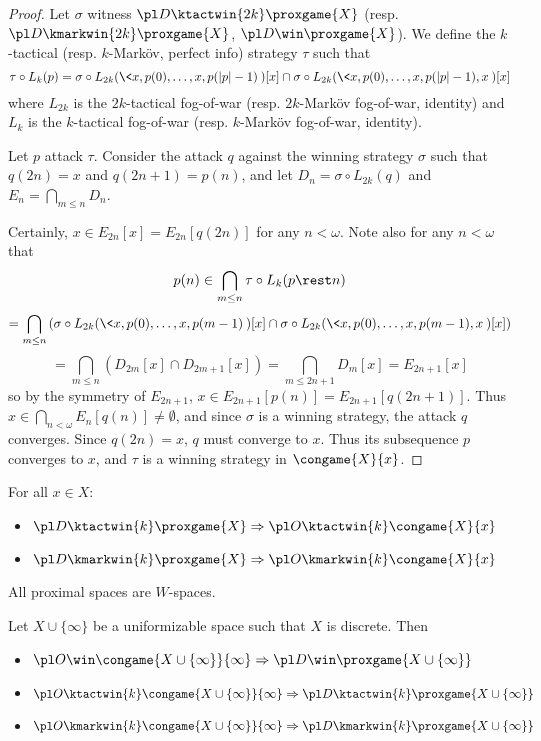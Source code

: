 \begin{proof}
Let $\sigma$ witness $\pl D \ktactwin{2k}\proxgame{X}$ (resp. $\pl D \kmarkwin{2k}\proxgame{X}$, $\pl D\win\proxgame{X}$). We define the $k$-tactical (resp. $k$-Mark\"ov, perfect info) strategy $\tau$ such that
  \[
    \tau\circ L_k(p)
      =
    \sigma\circ L_{2k}(\<x,p(0),\dots,x,p(|p|-1)\>)[x]
      \cap
    \sigma\circ L_{2k}(\<x,p(0),\dots,x,p(|p|-1),x\>)[x]
  \]
where $L_{2k}$ is the $2k$-tactical fog-of-war (resp. $2k$-Mark\"ov fog-of-war, identity) and $L_{k}$ is the $k$-tactical fog-of-war (resp. $k$-Mark\"ov fog-of-war, identity).

Let $p$ attack $\tau$. Consider the attack $q$ against the winning strategy $\sigma$ such that $q(2n)=x$ and $q(2n+1)=p(n)$, and let $D_n=\sigma\circ L_{2k}(q)$ and $E_n=\bigcap_{m\leq n}D_n$.

Certainly, $x\in E_{2n}[x]= E_{2n}[q(2n)]$ for any $n<\omega$. Note also for any $n<\omega$ that 
    \[
      p(n) \in 
      \bigcap_{m\leq n}\tau\circ L_k(p\rest n)
    \]
    \[
      =
      \bigcap_{m\leq n}\left(
        \sigma\circ L_{2k}(\<x,p(0),\dots,x,p(m-1)\>)[x]\cap
        \sigma\circ L_{2k}(\<x,p(0),\dots,x,p(m-1),x\>)[x]
      \right)
    \]
    \[
      =
      \bigcap_{m\leq n}\left(
        D_{2m}[x]\cap
        D_{2m+1}[x]
      \right) =
      \bigcap_{m\leq 2n+1} D_m[x]=E_{2n+1}[x]
    \]
so by the symmetry of $E_{2n+1}$, $x\in E_{2n+1}[p(n)]= E_{2n+1}[q(2n+1)]$. Thus $x\in \bigcap_{n<\omega} E_n[q(n)]\not=\emptyset$, and since $\sigma$ is a winning strategy, the attack $q$ converges. Since $q(2n)=x$, $q$ must converge to $x$. Thus its subsequence $p$ converges to $x$, and $\tau$ is a winning strategy in $\congame{X}{x}$.
\end{proof}

\begin{cor}
For all $x\in X$:
  \begin{itemize}
    \item
      $\pl D\ktactwin{k} \proxgame{X} \Rightarrow \pl O \ktactwin{k} \congame{X}{x}$
    \item
      $\pl D\kmarkwin{k} \proxgame{X} \Rightarrow \pl O \kmarkwin{k} \congame{X}{x}$
  \end{itemize}
\end{cor}

\begin{cor}
  All proximal spaces are $W$-spaces.
\end{cor}

\begin{thm}
  Let $X\cup\{\infty\}$ be a uniformizable space such that $X$ is discrete. Then
  \begin{itemize}
    \item
      $\pl O\win \congame{X\cup\{\infty\}}{\infty} \Rightarrow \pl D \win \proxgame{X\cup\{\infty\}}$
    \item
      $\pl O\ktactwin{k} \congame{X\cup\{\infty\}}{\infty} \Rightarrow \pl D \ktactwin{k} \proxgame{X\cup\{\infty\}}$
    \item
      $\pl O\kmarkwin{k} \congame{X\cup\{\infty\}}{\infty} \Rightarrow \pl D \kmarkwin{k} \proxgame{X\cup\{\infty\}}$
  \end{itemize}
\end{thm}

